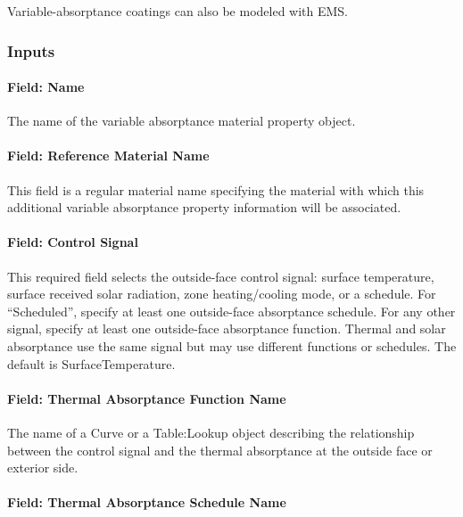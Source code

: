 Variable-absorptance coatings can also be modeled with EMS.

\subsubsection{Inputs}\label{inputs-materialpropertyvariableabsorptance}

\paragraph{Field: Name}\label{field-name-materialpropertyvariableabsorptance}

The name of the variable absorptance material property object.

\paragraph{Field: Reference Material Name}\label{field-reference-material-name-materialpropertyvariableabsorptance}

This field is a regular material name specifying the material with which this additional
variable absorptance property information will be associated.

\paragraph{Field: Control Signal}\label{field-control-signal}

This required field selects the outside-face control signal: surface temperature, surface received solar radiation, zone heating/cooling mode, or a schedule. For ``Scheduled'', specify at least one outside-face absorptance schedule. For any other signal, specify at least one outside-face absorptance function. Thermal and solar absorptance use the same signal but may use different functions or schedules. The default is SurfaceTemperature.

\paragraph{Field: Thermal Absorptance Function Name}\label{field-thermal-absorptance-function-name}

The name of a Curve or a Table:Lookup object describing the relationship between the control signal and the thermal absorptance at the outside face or exterior side.

\paragraph{Field: Thermal Absorptance Schedule Name}\label{field-thermal-absorptance-schedule-name}


